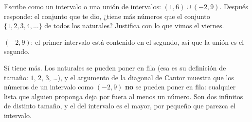 \documentclass[11pt]{article}
\begin{document}
\begin{preguntas}
\pregunta[1.25] Escribe como un intervalo o una unión de intervalos: $(1, 6) \cup (-2, 9)$.
Después responde: el conjunto que te dio, ¿tiene más números que el conjunto
$\{1, 2, 3, 4, \dots\}$ de todos los naturales? Justifica con lo que vimos el viernes.
\begin{solucion}[5.5cm]
$(-2, 9)$: el primer intervalo está contenido en el segundo, así que la unión es el segundo.

Sí tiene más. Los naturales se pueden poner en fila (esa es su definición de tamaño: $1$,
$2$, $3$, …), y el argumento de la diagonal de Cantor muestra que los números de un intervalo
como $(-2, 9)$ \textbf{no} se pueden poner en fila: cualquier lista que alguien proponga deja
por fuera al menos un número. Son dos infinitos de distinto tamaño, y el del intervalo es el
mayor, por pequeño que parezca el intervalo.
\end{solucion}

\end{preguntas}
\end{document}
